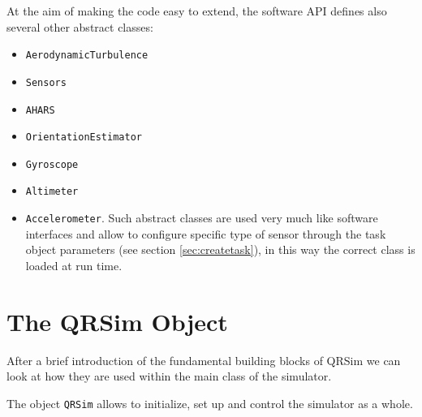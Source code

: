 \documentclass[a4paper,11pt]{report}
\newcommand{\sname}{QRSim\xspace}
\newcommand{\snamettt}{\texttt{QRSim}\xspace}
\begin{document}
At the aim of making the code easy to extend, the software API defines also several other abstract classes:
\begin{itemize}
\item \texttt{AerodynamicTurbulence}
\item \texttt{Sensors}
\item \texttt{AHARS}
\item \texttt{OrientationEstimator}
\item \texttt{Gyroscope}
\item \texttt{Altimeter}
\item \texttt{Accelerometer}.
Such abstract classes are used very much like software interfaces and allow to configure specific type of sensor through the task object parameters (see section \ref{sec:createtask}), in this way the correct class is loaded at run time.
\end{itemize}

\section{The \sname Object}\label{sec:qrobj}

After a brief introduction of the fundamental building blocks of \sname we can look at how they are used within the main class of the simulator. 

The object \snamettt allows to initialize, set up and control the simulator as a whole. 
\end{document}
